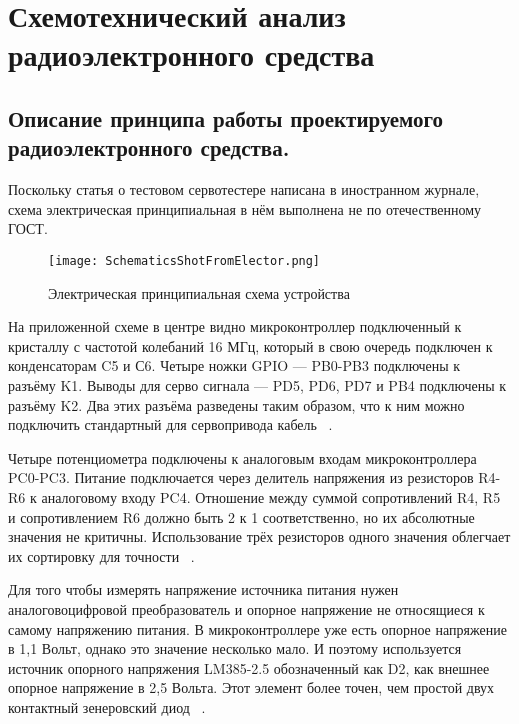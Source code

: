 \section{Схемотехнический анализ радиоэлектронного средства}


\subsection{Описание принципа работы
  проектируемого радиоэлектронного средства.}

Поскольку статья о тестовом сервотестере написана в иностранном
журнале, схема электрическая принципиальная в нём выполнена не по
отечественному ГОСТ.

\begin{figure}[H]
  \centering
  \texttt{[image: SchematicsShotFromElector.png]}
  \caption{Электрическая принципиальная схема устройства}
\end{figure}

На приложенной схеме в центре видно микроконтроллер подключенный к
кристаллу с частотой колебаний 16 МГц, который в свою очередь
подключен к конденсаторам C5 и С6. Четыре ножки GPIO — PB0-PB3
подключены к разъёму K1. Выводы для серво сигнала — PD5, PD6, PD7 и
PB4 подключены к разъёму K2. Два этих разъёма разведены таким
образом, что к ним можно подключить стандартный для сервопривода
кабель ~\cite{Elector521}.

Четыре потенциометра подключены к аналоговым входам микроконтроллера
PC0-PC3. Питание подключается через делитель напряжения из резисторов
R4-R6 к аналоговому входу PC4. Отношение между суммой сопротивлений
R4, R5 и сопротивлением R6 должно быть 2 к 1 соответственно, но их
абсолютные значения не критичны. Использование трёх резисторов одного
значения облегчает их сортировку для точности ~\cite{Elector521}.

Для того чтобы измерять напряжение источника питания нужен
аналоговоцифровой преобразователь и опорное напряжение не относящиеся
к самому напряжению питания.  В микроконтроллере уже есть опорное
напряжение в 1,1 Вольт, однако это значение несколько мало. И поэтому
используется источник опорного напряжения LM385-2.5 обозначенный как
D2, как внешнее опорное напряжение в 2,5 Вольта. Этот элемент более
точен, чем простой двух контактный зенеровский диод
~\cite{Elector521}.

